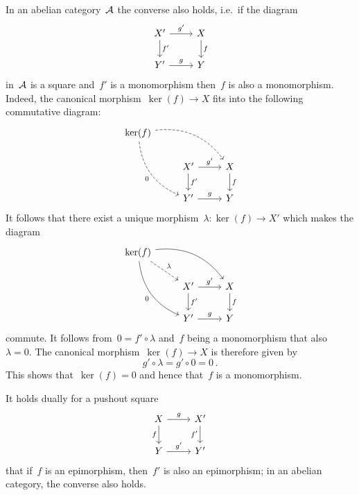 \begin{remark}
  In an abelian category~$\mathcal{A}$ the converse also holds, i.e.\ if the diagram
  \[
    \begin{tikzcd}
        X'
        \arrow{r}[above]{g'}
        \arrow{d}[right]{f'}
      & X
        \arrow{d}[right]{f}
      \\
        Y'
        \arrow{r}[above]{g}
      & Y
    \end{tikzcd}
  \]
  in~$\mathcal{A}$ is a {\pb} square and~$f'$ is a monomorphism then~$f$ is also a monomorphism.
  Indeed, the canonical morphism~$\ker(f) \to X$ fits into the following commutative diagram:
  \[
    \begin{tikzcd}
        \ker(f)
        \arrow[dashed,bend left]{drr}
        \arrow[dashed,bend right]{ddr}[below left]{0}
      & {}
      & {}
    \\
        {}
      & X'
        \arrow{r}[above]{g'}
        \arrow{d}[right]{f'}
      & X
        \arrow{d}[right]{f}
      \\
        {}
      & Y'
        \arrow{r}[above]{g}
      & Y
    \end{tikzcd}
  \]
  It follows that there exist a unique morphism~$\lambda \colon \ker(f) \to X'$ which makes the diagram
  \[
    \begin{tikzcd}
        \ker(f)
        \arrow[bend left]{drr}
        \arrow[dashed]{dr}[above right]{\lambda}
        \arrow[bend right]{ddr}[below left]{0}
      & {}
      & {}
    \\
        {}
      & X'
        \arrow{r}[above]{g'}
        \arrow{d}[right]{f'}
      & X
        \arrow{d}[right]{f}
      \\
        {}
      & Y'
        \arrow{r}[above]{g}
      & Y
    \end{tikzcd}
  \]
  commute.
  It follows from~$0 = f' \circ \lambda$ and~$f$ being a monomorphism that also~$\lambda = 0$.
  The canonical morphism~$\ker(f) \to X$ is therefore given by
  \[
      g' \circ \lambda
    = g' \circ 0
    = 0 \,.
  \]
  This shows that~$\ker(f) = 0$ and hence that~$f$ is a monomorphism.
\end{remark}


\begin{remark}
  \label{pushouts and epis}
  It holds dually for a pushout square
  \[
    \begin{tikzcd}
        X
        \arrow{r}[above]{g}
        \arrow{d}[left]{f}
      & X'
        \arrow{d}[left]{f'}
      \\
        Y
        \arrow{r}[above]{g'}
      & Y'
    \end{tikzcd}
  \]
  that if~$f$ is an epimorphism, then~$f'$ is also an epimorphism;
  in an abelian category, the converse also holds.
\end{remark}



